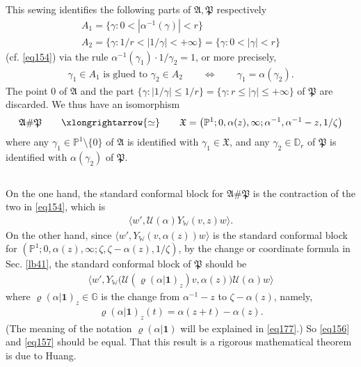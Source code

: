 \documentclass[11pt,b5paper,notitlepage]{article}
\theoremstyle{definition}
\theoremstyle{plain}
\newcommand{\fk}{\mathfrak}
\newcommand{\mc}{\mathcal}
\newcommand{\id}{\mathbf{1}}
\newcommand{\bk}[1]{\langle {#1}\rangle}
\newcommand{\bigbk}[1]{\big\langle {#1}\big\rangle}
\newcommand{\Wbb}{\mathbb W}
\newcommand{\Gbb}{\mathbb G}
\newcommand{\Pbb}{\mathbb P}
\newcommand{\Dbb}{\mathbb D}
\numberwithin{equation}{section}
\begin{document}
This sewing identifies the following  parts of $\fk A,\fk P$ respectively
\begin{gather*}
A_1=\{\gamma:0<|\alpha^{-1}(\gamma)|<r\}\\
A_2=\{\gamma:1/r<|1/\gamma|<+\infty\}=\{\gamma:0<|\gamma|<r\}	
\end{gather*}
(cf. \eqref{eq154}) via the rule $\alpha^{-1}(\gamma_1)\cdot 1/\gamma_2=1$, or more precisely,
\begin{align}
\gamma_1\in A_1 \text{ is glued to }\gamma_2\in A_2\qquad\Longleftrightarrow\qquad \gamma_1=\alpha(\gamma_2). 	
\end{align}
The point $0$ of $\fk A$ and the part $\{\gamma:|1/\gamma|\leq 1/r\}=\{\gamma:r\leq |\gamma|\leq+\infty\}$ of $\fk P$ are discarded. We thus have an isomorphism
\begin{align}
\fk A\#\fk P\qquad\xlongrightarrow{\simeq}\qquad\fk X=\big(\Pbb^1;0,\alpha(z),\infty;\alpha^{-1},\alpha^{-1}-z,1/\zeta\big)	
\end{align}
where any $\gamma_1\in\Pbb^1\setminus\{0\}$ of $\fk A$ is identified with $\gamma_1\in\fk X$, and any $\gamma_2\in\Dbb_r$ of $\fk P$ is identified with $\alpha(\gamma_2)$ of $\fk P$. 



\subsection{}


On the one hand, the standard conformal block for $\fk A\#\fk P$ is the contraction of the two in \eqref{eq154}, which is
\begin{align}
\bk{w',\mc U(\alpha)Y_\Wbb(v,z)w}.\label{eq156}	
\end{align}
On the other hand, since $\bk{w',Y_\Wbb(v,\alpha(z))w}$ is the standard conformal block for $(\Pbb^1;0,\alpha(z),\infty;\zeta,\zeta-\alpha(z),1/\zeta)$, by the change or coordinate formula in Sec. \ref{lb41}, the standard conformal block  of $\fk P$ should be
\begin{align}
\bigbk{w',Y_\Wbb\big(\mc U(\varrho(\alpha|\id)_z)v,\alpha(z)\big)\mc U(\alpha)w}	\label{eq157}
\end{align}
where $\varrho(\alpha|\id)_z\in\Gbb$ is the change from $\alpha^{-1}-z$ to $\zeta-\alpha(z)$, namely, \index{zz@$\varrho(\alpha\lvert\id),\varrho(\eta\lvert\mu)$}
\begin{align}
\varrho(\alpha|\id)_z(t)=\alpha(z+t)-\alpha(z).\label{eq161}
\end{align}
(The meaning of the notation $\varrho(\alpha|\id)$ will be explained in \eqref{eq177}.) So \eqref{eq156} and \eqref{eq157} should be equal. That this result is a rigorous mathematical theorem is due to Huang. 
\end{document}

